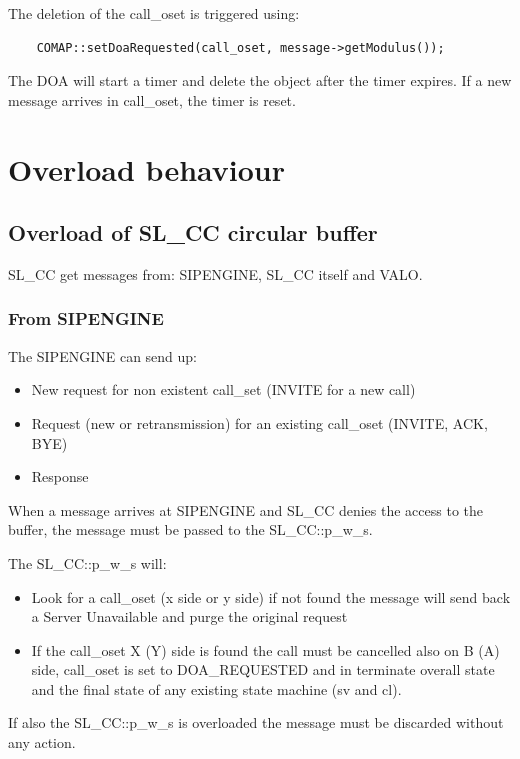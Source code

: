\documentclass[a4paper]{report}
\begin{document}
The deletion of the call\_oset is triggered using:
\begin{verbatim}
	COMAP::setDoaRequested(call_oset, message->getModulus());
\end{verbatim} 

The DOA will start a timer and delete the object after the timer expires. If a new message arrives in call\_oset, the timer is reset.

\section{Overload behaviour}

\subsection{Overload of SL\_CC circular buffer}

SL\_CC get messages from: SIPENGINE, SL\_CC itself and VALO.
\subsubsection{From SIPENGINE}
The SIPENGINE can send up:
\begin{itemize}
\item New request for non existent call\_set (INVITE for a new call)
\item Request (new or retransmission) for an existing call\_oset (INVITE, ACK, BYE)
\item Response 
\end{itemize}

When a message arrives at SIPENGINE and SL\_CC denies the access to the buffer, the message must
be passed to the SL\_CC::p\_w\_s.

The SL\_CC::p\_w\_s will:

\begin{itemize}
\item Look for a call\_oset (x side or y side) if not found the message
will send back a Server Unavailable and purge the original request
\item If the call\_oset X (Y) side is found the call must be cancelled also on B (A) side, call\_oset is set to DOA\_REQUESTED
and in terminate overall state and the final state of any existing state machine (sv and cl).
\end{itemize}

If also the SL\_CC::p\_w\_s is overloaded the message must be discarded without any action.
\end{document}
